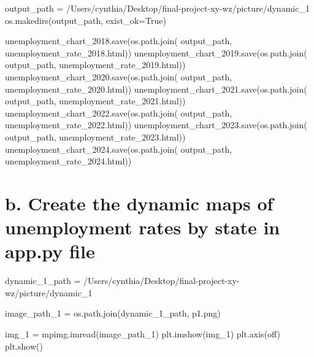 \documentclass[
  letterpaper,
  DIV=11,
  numbers=noendperiod]{scrartcl}
\newenvironment{Shaded}{\begin{snugshade}}{\end{snugshade}}
\newcommand{\NormalTok}[1]{\textcolor[rgb]{0.00,0.23,0.31}{#1}}
\newcommand{\OperatorTok}[1]{\textcolor[rgb]{0.37,0.37,0.37}{#1}}
\newcommand{\StringTok}[1]{\textcolor[rgb]{0.13,0.47,0.30}{#1}}
\newcommand{\VariableTok}[1]{\textcolor[rgb]{0.07,0.07,0.07}{#1}}
\begin{document}
\begin{Shaded}
\begin{Highlighting}[]
\NormalTok{output\_path }\OperatorTok{=} \StringTok{\textquotesingle{}/Users/cynthia/Desktop/final{-}project{-}xy{-}wz/picture/dynamic\_1\textquotesingle{}}
\NormalTok{os.makedirs(output\_path, exist\_ok}\OperatorTok{=}\VariableTok{True}\NormalTok{)}

\NormalTok{unemployment\_chart\_2018.save(os.path.join(}
\NormalTok{    output\_path, }\StringTok{\textquotesingle{}unemployment\_rate\_2018.html\textquotesingle{}}\NormalTok{))}
\NormalTok{unemployment\_chart\_2019.save(os.path.join(}
\NormalTok{    output\_path, }\StringTok{\textquotesingle{}unemployment\_rate\_2019.html\textquotesingle{}}\NormalTok{))}
\NormalTok{unemployment\_chart\_2020.save(os.path.join(}
\NormalTok{    output\_path, }\StringTok{\textquotesingle{}unemployment\_rate\_2020.html\textquotesingle{}}\NormalTok{))}
\NormalTok{unemployment\_chart\_2021.save(os.path.join(}
\NormalTok{    output\_path, }\StringTok{\textquotesingle{}unemployment\_rate\_2021.html\textquotesingle{}}\NormalTok{))}
\NormalTok{unemployment\_chart\_2022.save(os.path.join(}
\NormalTok{    output\_path, }\StringTok{\textquotesingle{}unemployment\_rate\_2022.html\textquotesingle{}}\NormalTok{))}
\NormalTok{unemployment\_chart\_2023.save(os.path.join(}
\NormalTok{    output\_path, }\StringTok{\textquotesingle{}unemployment\_rate\_2023.html\textquotesingle{}}\NormalTok{))}
\NormalTok{unemployment\_chart\_2024.save(os.path.join(}
\NormalTok{    output\_path, }\StringTok{\textquotesingle{}unemployment\_rate\_2024.html\textquotesingle{}}\NormalTok{))}
\end{Highlighting}
\end{Shaded}

\section{b. Create the dynamic maps of unemployment rates by state in
app.py
file}\label{b.-create-the-dynamic-maps-of-unemployment-rates-by-state-in-app.py-file}

\begin{Shaded}
\begin{Highlighting}[]
\NormalTok{dynamic\_1\_path }\OperatorTok{=} \StringTok{\textquotesingle{}/Users/cynthia/Desktop/final{-}project{-}xy{-}wz/picture/dynamic\_1\textquotesingle{}}

\NormalTok{image\_path\_1 }\OperatorTok{=}\NormalTok{ os.path.join(dynamic\_1\_path, }\StringTok{\textquotesingle{}p1.png\textquotesingle{}}\NormalTok{)}

\NormalTok{img\_1 }\OperatorTok{=}\NormalTok{ mpimg.imread(image\_path\_1)}
\NormalTok{plt.imshow(img\_1)}
\NormalTok{plt.axis(}\StringTok{\textquotesingle{}off\textquotesingle{}}\NormalTok{)}
\NormalTok{plt.show()}
\end{Highlighting}
\end{Shaded}
\end{document}
